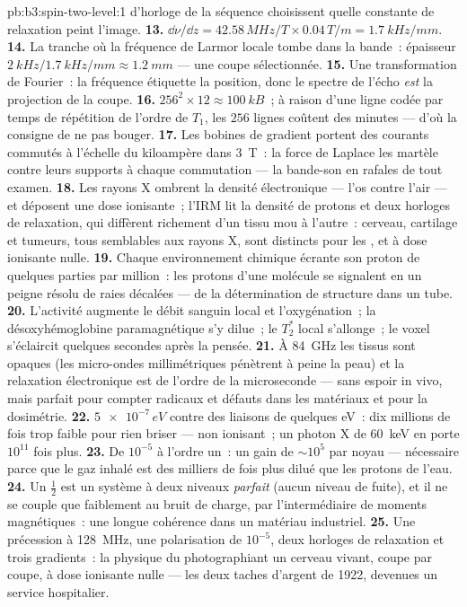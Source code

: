 \begin{solution}{pb:b3:spin-two-level:1}
d'horloge de la séquence choisissent quelle constante de relaxation
peint l'image.
\textbf{13.} $\dd\nu/\dd z = 42.58\,\unit{MHz/T} \times
0.04\,\unit{T/m} = \qty{1.7}{kHz/mm}$.
\textbf{14.} La tranche où la fréquence de Larmor locale tombe dans
la bande~: épaisseur $\qty{2}{kHz}/\qty{1.7}{kHz/mm} \approx
\qty{1.2}{mm}$ --- une coupe sélectionnée.
\textbf{15.} Une transformation de Fourier~: la fréquence étiquette
la position, donc le spectre de l'écho \emph{est} la projection de la
coupe.
\textbf{16.} $256^2 \times 12 \approx \qty{100}{kB}$~; à raison
d'une ligne codée par temps de répétition de l'ordre de $T_1$, les
$256$ lignes coûtent des minutes --- d'où la consigne de ne pas
bouger.
\textbf{17.} Les bobines de gradient portent des courants commutés à
l'échelle du kiloampère dans \qty{3}{T}~: la force de Laplace les
martèle contre leurs supports à chaque commutation --- la
bande-son en rafales de tout examen.
\textbf{18.} Les rayons X ombrent la densité électronique --- l'os
contre l'air --- et déposent une dose ionisante~; l'IRM lit la
densité de protons et deux horloges de relaxation, qui diffèrent
richement d'un tissu mou à l'autre~: cerveau, cartilage et tumeurs,
tous semblables aux rayons X, sont distincts pour les , et à
dose ionisante nulle.
\textbf{19.} Chaque environnement chimique écrante son proton de
quelques parties par million~: les protons d'une molécule se
signalent en un peigne résolu de raies décalées --- de la
détermination de structure dans un tube.
\textbf{20.} L'activité augmente le débit sanguin local et
l'oxygénation~; la désoxyhémoglobine paramagnétique s'y dilue~; le
$T_2^*$ local s'allonge~; le voxel s'éclaircit quelques secondes
après la pensée.
\textbf{21.} À \qty{84}{GHz} les tissus sont opaques (les
micro-ondes millimétriques pénètrent à peine la peau) et la
relaxation électronique est de l'ordre de la microseconde ---
sans espoir in vivo, mais parfait pour compter radicaux et défauts
dans les matériaux et pour la dosimétrie.
\textbf{22.} $\num{5e-7}\,\unit{eV}$ contre des liaisons de
quelques eV~: dix millions de fois trop faible pour rien briser ---
non ionisant~; un photon X de \qty{60}{keV} en porte $10^{11}$ fois
plus.
\textbf{23.} De $10^{-5}$ à l'ordre un~: un gain de $\sim10^5$ par
noyau --- nécessaire parce que le gaz inhalé est des milliers de fois
plus dilué que les protons de l'eau.
\textbf{24.} Un  $\tfrac12$ est un système à deux niveaux
\emph{parfait} (aucun niveau de fuite), et il ne se couple que
faiblement au bruit de charge, par l'intermédiaire de moments
magnétiques~: une longue cohérence dans un matériau industriel.
\textbf{25.} Une précession à \qty{128}{MHz}, une polarisation de
$10^{-5}$, deux horloges de relaxation et trois gradients~: la
physique du  photographiant un cerveau vivant, coupe par coupe,
à dose ionisante nulle --- les deux taches d'argent de 1922, devenues
un service hospitalier.
\end{solution}
